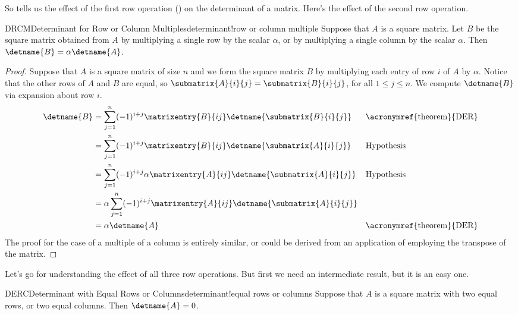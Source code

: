 %
So  tells us the effect of the first row operation () on the determinant of a matrix.  Here's the effect of the second row operation.
%
\begin{theorem}{DRCM}{Determinant for Row or Column Multiples}{determinant!row or column multiple}
Suppose that $A$ is a square matrix.  Let $B$ be the square matrix obtained from $A$ by multiplying a single row by the scalar $\alpha$, or by multiplying a single column by the scalar $\alpha$.  Then $\detname{B}=\alpha\detname{A}$.
\end{theorem}
%
\begin{proof}
Suppose that $A$ is a square matrix of size $n$ and we form the square matrix $B$ by multiplying each entry of row $i$ of $A$ by $\alpha$.  Notice that the other rows of $A$ and $B$ are equal, so $\submatrix{A}{i}{j}=\submatrix{B}{i}{j}$, for all $1\leq j\leq n$.  We compute $\detname{B}$ via expansion about row $i$.
%
\begin{align*}
\detname{B}
&=
\sum_{j=1}^{n}(-1)^{i+j}\matrixentry{B}{ij}\detname{\submatrix{B}{i}{j}}
&&\text{\acronymref{theorem}{DER}}\\
%
&=
\sum_{j=1}^{n}(-1)^{i+j}\matrixentry{B}{ij}\detname{\submatrix{A}{i}{j}}
&&\text{Hypothesis}\\
%
&=
\sum_{j=1}^{n}(-1)^{i+j}\alpha\matrixentry{A}{ij}\detname{\submatrix{A}{i}{j}}
&&\text{Hypothesis}\\
%
&=
\alpha\sum_{j=1}^{n}(-1)^{i+j}\matrixentry{A}{ij}\detname{\submatrix{A}{i}{j}}\\
%
&=
\alpha\detname{A}&&\text{\acronymref{theorem}{DER}}\\
%
\end{align*}
%
The proof for the case of a multiple of a column is entirely similar, or could be derived from an application of  employing the transpose of the matrix.
%
\end{proof}
%
Let's go for understanding the effect of all three row operations.  But first we need an intermediate result, but it is an easy one.
%
\begin{theorem}{DERC}{Determinant with Equal Rows or Columns}{determinant!equal rows or columns}
Suppose that $A$ is a square matrix with two equal rows, or two equal columns.  Then $\detname{A}=0$.
\end{theorem}
%
